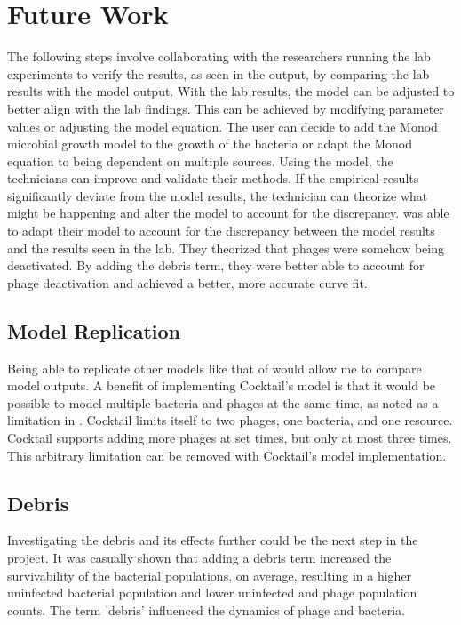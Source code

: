\section{Future Work}
\label{Future Work}
The following steps involve collaborating with the researchers running the lab experiments to verify the results, as seen in the output, by comparing the lab results with the model output. 
With the lab results, the model can be adjusted to better align with the lab findings. 
This can be achieved by modifying parameter values or adjusting the model equation. 
The user can decide to add the Monod microbial growth model to the growth of the bacteria or adapt the Monod equation to being dependent on multiple sources. 
Using the model, the technicians can improve and validate their methods. 
If the empirical results significantly deviate from the model results, the technician can theorize what might be happening and alter the model to account for the discrepancy. 
\citet{deyEmergentHigherorderInteractions2025} was able to adapt their model to account for the discrepancy between the model results and the results seen in the lab. 
They theorized that phages were somehow being deactivated. 
By adding the debris term, they were better able to account for phage deactivation and achieved a better, more accurate curve fit. 

\subsection{Model Replication}
Being able to replicate other models like that of \citet{nilssonCocktailComputerProgram2022} would allow me to compare model outputs. 
A benefit of implementing Cocktail's model is that it would be possible to model multiple bacteria and phages at the same time, as noted as a limitation in . 
Cocktail limits itself to two phages, one bacteria, and one resource. 
Cocktail supports adding more phages at set times, but only at most three times. 
This arbitrary limitation can be removed with Cocktail's model implementation. 

\subsection{Debris}
Investigating the debris and its effects further could be the next step in the project. 
It was casually shown that adding a debris term increased the survivability of the bacterial populations, on average, resulting in a higher uninfected bacterial population and lower uninfected and phage population counts. 
The term 'debris' influenced the dynamics of phage and bacteria. 

